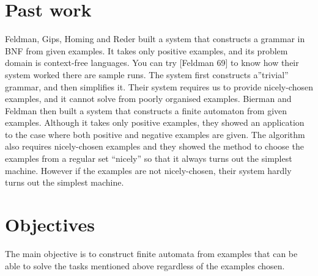 \documentclass[14pt]{article}
\begin{document}
\section{Past work}
Feldman, Gips, Homing and Reder built a system that constructs a grammar in BNF from given examples. It takes only positive examples, and its problem domain is context-free languages.
You can try [Feldman 69] to know how their system worked there are sample runs.
The system first constructs a”trivial” grammar, and then simplifies it. Their system requires us to provide nicely-chosen examples, and it cannot solve from poorly organised examples.
Bierman and Feldman then built a system that constructs a finite automaton from given examples. Although it takes only positive examples, they showed an application to the case where both positive and negative examples are given. The algorithm also requires nicely-chosen examples and they showed the method to choose the examples from a regular set “nicely” so that it always turns out the simplest machine. However if the examples are not nicely-chosen, their system hardly turns out the simplest machine.
\section{Objectives}
The main objective is to construct finite automata from examples that can be able to solve the tasks mentioned above regardless of the examples chosen. 
\end{document}
